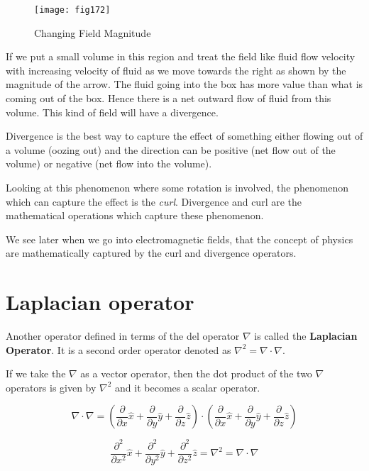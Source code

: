  \begin{figure}
 	\centering
 	\texttt{[image: fig172]}
 	\caption{Changing Field Magnitude}
 	
 \end{figure}
 
 If we put a small volume in this region and treat the field like fluid flow velocity with increasing velocity of fluid as we move towards the right as shown by the magnitude of the arrow. The fluid going into the box has more value than what is coming out of the box. Hence there is a net outward flow of fluid from this volume. This kind of field will have a divergence.
 
 Divergence is the best way to capture the effect of something either flowing out of a volume (oozing out) and the direction can be positive (net flow out of the volume) or negative (net flow into the volume).
 
 Looking at this phenomenon where some rotation is involved, the phenomenon which can capture the effect is the \textit{curl}. Divergence and curl are the mathematical operations which capture these phenomenon.
 
 We see later when we go into electromagnetic fields, that the concept of physics are mathematically captured by the curl and divergence operators.
 
 \section{Laplacian operator}
 Another operator defined in terms of the del operator $\nabla$ is called the \textbf{Laplacian Operator}. It is a second order operator denoted as $\nabla^2 = \nabla \cdot \nabla$.\newline
 
 
 If we take the $\nabla$ as a vector operator, then the dot product of the two $\nabla$ operators is given by $\nabla^2$ and it becomes a scalar operator.
	
\begin{equation}
\nabla \cdot \nabla = ( \frac{\partial  }{\partial x}\hat x + \frac{\partial  }{\partial y}\hat y + \frac{\partial  }{\partial z}\hat z ) \cdot ( \frac{\partial  }{\partial x}\hat x + \frac{\partial  }{\partial y}\hat y + \frac{\partial  }{\partial z}\hat z)
\end{equation}
	
\begin{equation}
\frac{\partial^{2}  }{\partial x^{2}}\hat x + \frac{\partial^{2}  }{\partial y^{2}}\hat y + \frac{\partial^{2}  }{\partial z^{2}}\hat z = \nabla^{2} = \nabla \cdot \nabla
\end{equation}

